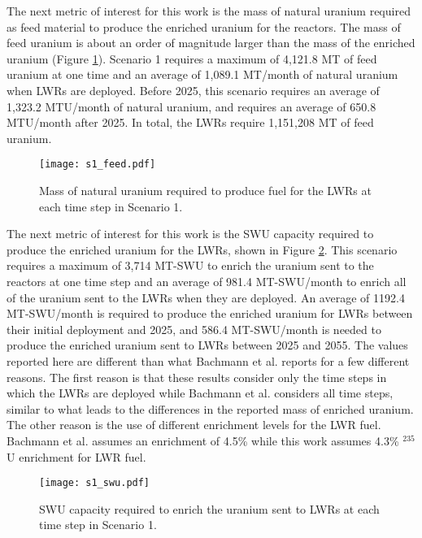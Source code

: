 The next metric of interest for this work is the mass of natural uranium 
required as feed material to produce the enriched uranium for the 
reactors. The mass of feed uranium 
is about an order of magnitude larger than the mass of the enriched uranium 
(Figure \ref{fig:feed1}). Scenario 1 requires a maximum of 4,121.8 MT of 
feed uranium at one time and an average of 1,089.1 MT/month of natural uranium 
when \glspl{LWR} are deployed. Before 2025, this scenario requires an average of 
1,323.2 MTU/month of natural uranium, and requires an average of 650.8 MTU/month 
after 2025. In total, the \glspl{LWR} require 1,151,208 MT of feed uranium.

\begin{figure}
    \centering
    \texttt{[image: s1\_feed.pdf]}
    \caption{Mass of natural uranium required to produce fuel for the LWRs at each 
    time step in Scenario 1.}
    \label{fig:feed1}
\end{figure}

The next metric of interest for this work is the \gls{SWU} capacity required 
to produce the enriched uranium for the \glspl{LWR}, 
shown in Figure \ref{fig:swu1}. This scenario requires a maximum of 3,714 MT-SWU 
to 
enrich the uranium sent to the reactors at one time step and an average of 
981.4 MT-SWU/month to enrich all of the uranium sent to 
the \glspl{LWR} when they are deployed. An average of 
1192.4 MT-SWU/month is required to produce the enriched uranium 
for \glspl{LWR} between their initial deployment and 2025, and 
586.4 MT-SWU/month is needed to produce the 
enriched uranium sent to \glspl{LWR} between 2025 and 2055. The values 
reported here are different than what Bachmann et al. \cite{bachmann_enrichment_2021}
reports for a few different reasons. The first reason is that these results  
consider only
the time steps in which the \glspl{LWR} are deployed while Bachmann et al. 
considers all time steps, similar to what leads to the differences in the 
reported mass of 
enriched uranium. The other reason
is the use of different enrichment levels for the \gls{LWR} fuel. 
Bachmann et al. assumes an enrichment of 4.5\% while this work assumes 4.3\%
$^{235}$U enrichment for \gls{LWR} fuel. 


\begin{figure}
    \centering
    \texttt{[image: s1\_swu.pdf]}
    \caption{SWU capacity required to enrich the uranium sent to LWRs at each time step in Scenario 1.}
    \label{fig:swu1}
\end{figure}

